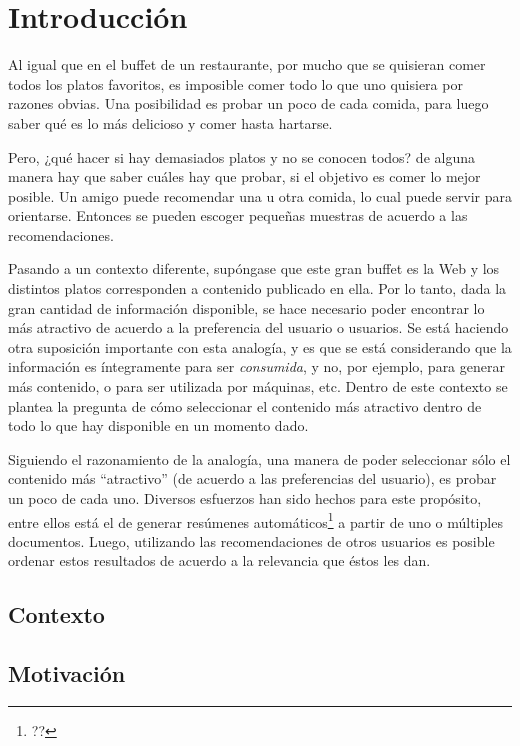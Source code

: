 \chapter{Introducción}
\label{sec-1}

Al igual que en el buffet de un restaurante, por mucho que se quisieran
comer todos los platos favoritos, es imposible comer todo lo que uno
quisiera por razones obvias. Una posibilidad es probar un poco de cada
comida, para luego saber qué es lo más delicioso y comer hasta
hartarse.

Pero, ¿qué hacer si hay demasiados platos y no se conocen todos? de
alguna manera hay que saber cuáles hay que probar, si el objetivo es
comer lo mejor posible. Un amigo puede recomendar una u otra comida,
lo cual puede servir para orientarse. Entonces se pueden escoger
pequeñas muestras de acuerdo a las recomendaciones.

Pasando a un contexto diferente, supóngase que este gran buffet es la
Web y los distintos platos corresponden a contenido publicado en
ella. Por lo tanto, dada la gran cantidad de información disponible,
se hace necesario poder encontrar lo más atractivo de acuerdo a la
preferencia del usuario o usuarios. Se está haciendo otra suposición
importante con esta analogía, y es que se está considerando que la
información es íntegramente para ser \emph{consumida}, y no, por ejemplo, para
generar más contenido, o para ser utilizada por máquinas, etc. Dentro de
este contexto se plantea la pregunta de cómo seleccionar el contenido
más atractivo dentro de todo lo que hay disponible en un momento dado.

Siguiendo el razonamiento de la analogía, una manera de poder
seleccionar sólo el contenido más ``atractivo'' (de acuerdo a las
preferencias del usuario), es probar un poco de cada uno. Diversos
esfuerzos han sido hechos para este propósito, entre ellos está el de
generar resúmenes automáticos\footnote{?? } a partir de uno o múltiples
documentos. Luego, utilizando las recomendaciones de otros usuarios es
posible ordenar estos resultados de acuerdo a la relevancia que éstos
les dan.

\section{Contexto}
\label{sec-1.1}

\section{Motivación}
\label{sec-1.2}

